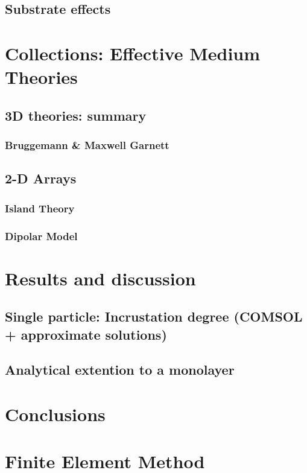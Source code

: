 \documentclass[11pt]{Latex/Classes/PhDthesisPSnPDF}
\begin{document}
	\section{Substrate effects}

\chapter{Collections: Effective Medium Theories}
		\section{3D theories: summary}	
			\subsection{Bruggemann \& Maxwell Garnett}
		\section{2-D Arrays}
			\subsection{Island Theory}
			\subsection{Dipolar Model}

\chapter{Results and discussion}
	\section{Single particle: Incrustation degree (COMSOL + approximate solutions)}
	\section{Analytical extention to a monolayer}

\chapter{Conclusions}

\appendix
\chapter{Finite Element Method}
%
%
%	
%
%        
%
%
%  
\end{document}
